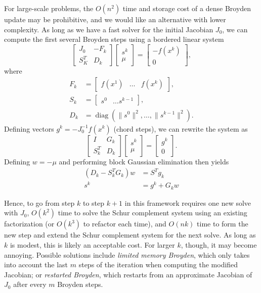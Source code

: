 \documentclass[12pt, leqno]{article} %
\begin{document}
For large-scale problems, the \(O(n^2)\) time and storage cost of a
dense Broyden update may be prohibitive, and we would like an
alternative with lower complexity. As long as we have a fast solver for
the initial Jacobian \(J_0\), we can compute the first several Broyden
steps using a bordered linear system
\[\begin{bmatrix} J_0 & -F_k \\ S_K^T & D_k \end{bmatrix}
  \begin{bmatrix} s^k \\ \mu \end{bmatrix} = 
  \begin{bmatrix} -f(x^k) \\ 0 \end{bmatrix},\] where \begin{align*}
  F_k &= \begin{bmatrix} f(x^1) & \ldots & f(x^k) \end{bmatrix}, \\
  S_k &= \begin{bmatrix} s^0 & \ldots s^{k-1} \end{bmatrix}, \\
  D_k &= \operatorname{diag}( \|s^0\|^2, \ldots, \|s^{k-1}\|^2).
\end{align*} Defining vectors \(g^k = -J_0^{-1} f(x^k)\) (chord steps),
we can rewrite the system as
\[\begin{bmatrix} I & G_k \\ S_k^T & D_k \end{bmatrix} 
  \begin{bmatrix} s^k \\ \mu \end{bmatrix} =
  \begin{bmatrix} g^k \\ 0 \end{bmatrix}.\] Defining \(w = -\mu\) and
performing block Gaussian elimination then yields \begin{align*}
  (D_k - S_k^T G_k) w &= S^T g_k \\
  s^k &= g^k + G_k w
\end{align*}

Hence, to go from step \(k\) to step \(k+1\) in this framework requires
one new solve with \(J_0\), \(O(k^2)\) time to solve the Schur
complement system using an existing factorization (or \(O(k^3)\) to
refactor each time), and \(O(nk)\) time to form the new step and extend
the Schur complement system for the next solve. As long as \(k\) is
modest, this is likely an acceptable cost. For larger \(k\), though, it
may become annoying. Possible solutions include \emph{limited memory
Broyden}, which only takes into account the last \(m\) steps of the
iteration when computing the modified Jacobian; or \emph{restarted
Broyden}, which restarts from an approximate Jacobian of \(J_0\) after
every \(m\) Broyden steps.
\end{document}

